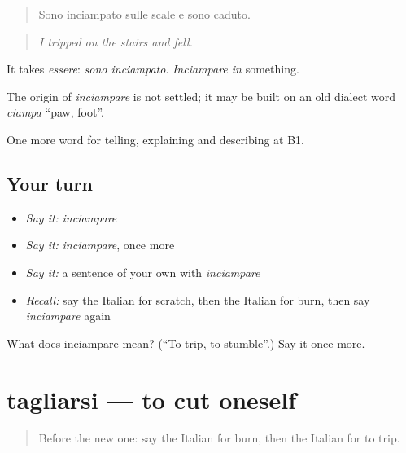 \begin{quote}
Sono inciampato sulle scale e sono caduto.
\end{quote}

\begin{quote}
\emph{I tripped on the stairs and fell.}
\end{quote}

It takes \emph{essere}: \emph{sono inciampato}. \emph{Inciampare in} something.

\begin{cousinweb}
The origin of \emph{inciampare} is not settled; it may be built on an old dialect word \emph{ciampa} \textquotedblleft{}paw, foot\textquotedblright{}.
\end{cousinweb}

\begin{grammarlens}[title={What you've built}]
One more word for telling, explaining and describing at B1.
\end{grammarlens}

\subsection*{Your turn}
\begin{itemize}
\raggedright
  \item \emph{Say it:} \emph{inciampare}
  \item \emph{Say it:} \emph{inciampare}, once more
  \item \emph{Say it:} a sentence of your own with \emph{inciampare}
  \item \emph{Recall:} say the Italian for scratch, then the Italian for burn, then say \emph{inciampare} again
\end{itemize}

\begin{tcolorbox}[breakable,colback=teal!4,colframe=teal!35!black,title={Before you move on}]
What does inciampare mean? (\textquotedblleft{}To trip, to stumble\textquotedblright{}.) Say it once more.
\end{tcolorbox}
\section[tagliarsi]{tagliarsi — to cut oneself}

\label{lesson:IT-C483-tagliarsi}



\begin{quote}
Before the new one: say the Italian for burn, then the Italian for to trip.
\end{quote}

